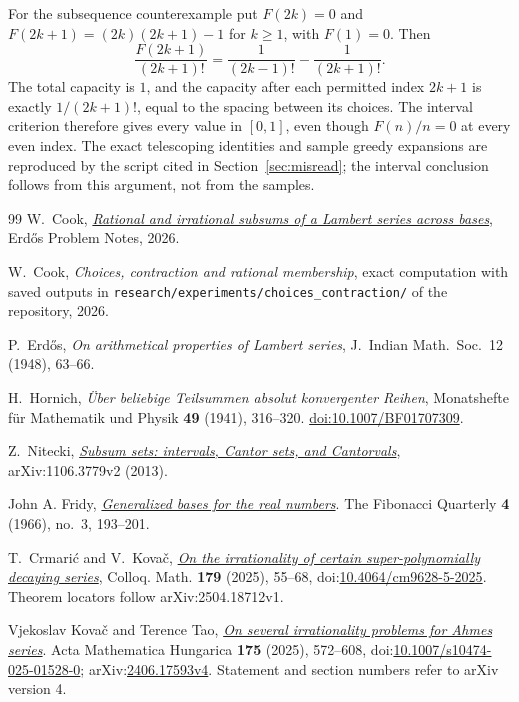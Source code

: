 \documentclass[11pt]{article}
\begin{document}
For the subsequence counterexample put $F(2k)=0$ and
$F(2k+1)=(2k)(2k+1)-1$ for $k\ge1$, with $F(1)=0$.  Then
\[
 \frac{F(2k+1)}{(2k+1)!}
 =\frac1{(2k-1)!}-\frac1{(2k+1)!}.
\]
The total capacity is $1$, and the capacity after each permitted index
$2k+1$ is exactly $1/(2k+1)!$, equal to the spacing between its choices.
The interval criterion therefore gives every value in $[0,1]$, even though
$F(n)/n=0$ at every even index.  The exact telescoping identities and sample
greedy expansions are reproduced by the script cited in
Section~\ref{sec:misread}; the interval conclusion follows from this argument,
not from the samples.

\begin{thebibliography}{99}
 W.~Cook,
  \href{erdos-synthesis-subsums-across-bases.pdf}{\emph{Rational
  and irrational subsums of a Lambert series across bases}}, Erd\H{o}s Problem
  Notes, 2026.

 W.~Cook,
  \emph{Choices, contraction and rational membership}, exact computation with saved outputs in \texttt{research/experiments/choices\_contraction/} of the repository,
  2026.

 P.~Erd\H{o}s, \emph{On arithmetical properties of Lambert
  series}, J.~Indian Math.\ Soc.\ 12 (1948), 63--66.

H.~Hornich,
\emph{\"Uber beliebige Teilsummen absolut konvergenter Reihen},
Monatshefte f\"ur Mathematik und Physik \textbf{49} (1941), 316--320.
\href{https://doi.org/10.1007/BF01707309}{doi:10.1007/BF01707309}.

 Z.~Nitecki,
  \href{https://arxiv.org/abs/1106.3779v2}{\emph{Subsum sets: intervals, Cantor
  sets, and Cantorvals}}, arXiv:1106.3779v2 (2013).

 John A. Fridy, \href{https://www.fq.math.ca/Scanned/4-3/fridy.pdf}{\emph{Generalized bases for the real numbers}}.
  The Fibonacci Quarterly \textbf{4} (1966), no.~3, 193--201.

 T.~Crmari\'{c} and V.~Kova\v{c},
  \href{https://arxiv.org/abs/2504.18712v1}
  {\emph{On the irrationality of certain super-polynomially decaying series}},
  Colloq. Math. \textbf{179} (2025), 55--68,
  doi:\href{https://doi.org/10.4064/cm9628-5-2025}{10.4064/cm9628-5-2025}.
  Theorem locators follow arXiv:2504.18712v1.

 Vjekoslav Kova\v{c} and Terence Tao, \href{https://arxiv.org/abs/2406.17593v4}{\emph{On several irrationality problems for Ahmes series}}.
  Acta Mathematica Hungarica \textbf{175} (2025), 572--608, doi:\href{https://doi.org/10.1007/s10474-025-01528-0}{10.1007/s10474-025-01528-0}; arXiv:\href{https://arxiv.org/abs/2406.17593v4}{2406.17593v4}. Statement and section numbers refer to arXiv version 4.


\end{thebibliography}
\end{document}
